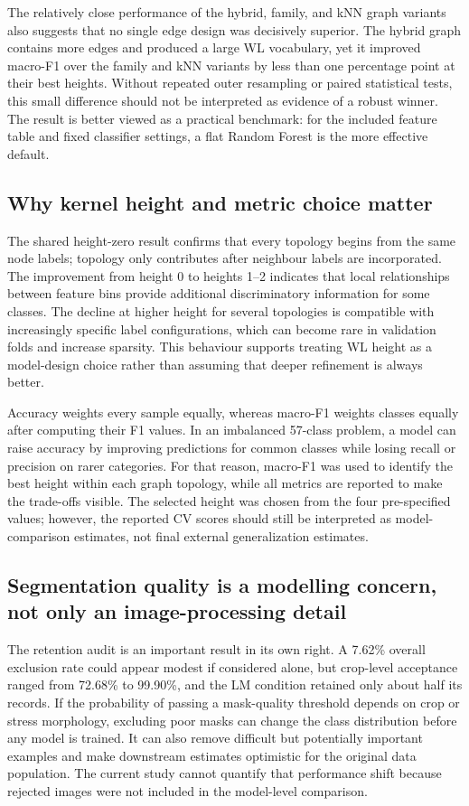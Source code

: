 \documentclass[conference]{IEEEtran}
\begin{document}
The relatively close performance of the hybrid, family, and kNN graph variants also suggests that no single edge design was decisively superior. The hybrid graph contains more edges and produced a large WL vocabulary, yet it improved macro-F1 over the family and kNN variants by less than one percentage point at their best heights. Without repeated outer resampling or paired statistical tests, this small difference should not be interpreted as evidence of a robust winner. The result is better viewed as a practical benchmark: for the included feature table and fixed classifier settings, a flat Random Forest is the more effective default.

\subsection{Why kernel height and metric choice matter}

The shared height-zero result confirms that every topology begins from the same node labels; topology only contributes after neighbour labels are incorporated. The improvement from height 0 to heights 1--2 indicates that local relationships between feature bins provide additional discriminatory information for some classes. The decline at higher height for several topologies is compatible with increasingly specific label configurations, which can become rare in validation folds and increase sparsity. This behaviour supports treating WL height as a model-design choice rather than assuming that deeper refinement is always better.

Accuracy weights every sample equally, whereas macro-F1 weights classes equally after computing their F1 values. In an imbalanced 57-class problem, a model can raise accuracy by improving predictions for common classes while losing recall or precision on rarer categories. For that reason, macro-F1 was used to identify the best height within each graph topology, while all metrics are reported to make the trade-offs visible. The selected height was chosen from the four pre-specified values; however, the reported CV scores should still be interpreted as model-comparison estimates, not final external generalization estimates.

\subsection{Segmentation quality is a modelling concern, not only an image-processing detail}

The retention audit is an important result in its own right. A 7.62\% overall exclusion rate could appear modest if considered alone, but crop-level acceptance ranged from 72.68\% to 99.90\%, and the LM condition retained only about half its records. If the probability of passing a mask-quality threshold depends on crop or stress morphology, excluding poor masks can change the class distribution before any model is trained. It can also remove difficult but potentially important examples and make downstream estimates optimistic for the original data population. The current study cannot quantify that performance shift because rejected images were not included in the model-level comparison.
\end{document}
